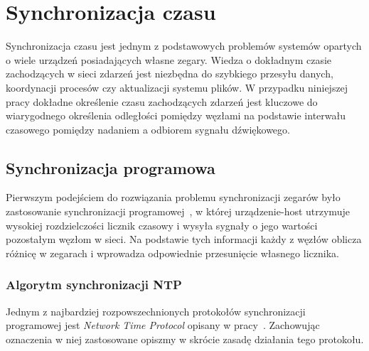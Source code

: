 \chapter{Synchronizacja czasu}\label{chap:time_sync}

Synchronizacja czasu jest jednym z podstawowych problemów systemów opartych o wiele urządzeń posiadających własne zegary. Wiedza o dokładnym czasie zachodzących w sieci zdarzeń jest niezbędna do szybkiego przesyłu danych, koordynacji procesów czy aktualizacji systemu plików. W przypadku niniejszej pracy dokładne określenie czasu zachodzących zdarzeń jest kluczowe do wiarygodnego określenia odległości pomiędzy węzłami na podstawie interwału czasowego pomiędzy nadaniem a odbiorem sygnału dźwiękowego.

\section{Synchronizacja programowa}\label{sec:prog_sync}

Pierwszym podejściem do rozwiązania problemu synchronizacji zegarów było zastosowanie synchronizacji programowej~\cite{6066334}, w której urządzenie-host utrzymuje wysokiej rozdzielczości licznik czasowy i wysyła sygnały o jego wartości pozostałym węzłom w sieci. Na podstawie tych informacji każdy z węzłów oblicza różnicę w zegarach i wprowadza odpowiednie przesunięcie własnego licznika.

\subsection{Algorytm synchronizacji NTP}\label{sec:ntp_sync}

Jednym z najbardziej rozpowszechnionych protokołów synchronizacji programowej jest \textit{Network Time Protocol} opisany w pracy~\cite{103043}. Zachowując oznaczenia w niej zastosowane opiszmy w skrócie zasadę działania tego protokołu.

